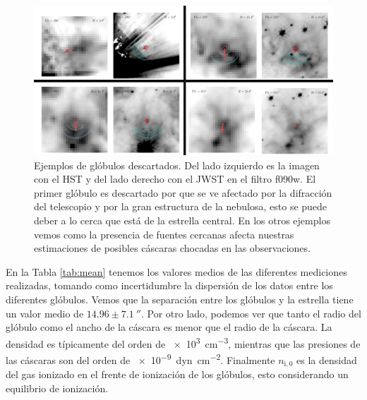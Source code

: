 \documentclass{book}
\begin{document}
\begin{figure}[htb]
    \centering
    \includegraphics[width=\textwidth]{Nuevas imagenes finales/Malos_ajustes_final.pdf}
    \caption{Ejemplos de glóbulos descartados. Del lado izquierdo es
      la imagen con el HST y del lado derecho con el JWST en el filtro
      f090w. El primer glóbulo es descartado por que se ve afectado
      por la difracción del telescopio y por la gran estructura de la
      nebulosa, esto se puede deber a lo cerca que está de la estrella
      central. En los otros ejemplos vemos como la presencia de
      fuentes cercanas afecta nuestras estimaciones de posibles
      cáscaras chocadas en las observaciones.}
    \label{Bad Globules}
\end{figure}

En la Tabla \ref{tab:mean} tenemos los valores medios de las
diferentes mediciones realizadas, tomando como incertidumbre la
dispersión de los datos entre los diferentes glóbulos. Vemos que la
separación entre los glóbulos y la estrella tiene un valor medio de
$14.96\pm\SI{7.1}{\arcsecond}$. Por otro lado, podemos ver que tanto el
radio del glóbulo como el ancho de la cáscara es menor que el radio de
la cáscara. La densidad es típicamente del orden de \SI{e3}{cm^{-3}},
mientras que las presiones de las cáscaras son del orden de
\SI{e-9}{dyn.cm^{-2}}. Finalmente $n_\mathrm{i,0}$ es la densidad del
gas ionizado en el frente de ionización de los glóbulos, esto
considerando un equilibrio de ionización.
\end{document}
